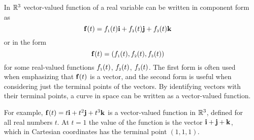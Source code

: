 In $\mathbb{R}^3$ vector-valued function of a real variable can be written in component form as
\begin{displaymath}
 \mathbf{ f}(t) = f_{\scriptscriptstyle 1}(t) \mathbf{ i} + f_{\scriptscriptstyle 2}(t) \mathbf{ j} + f_{\scriptscriptstyle 3}(t) \mathbf{ k}
\end{displaymath}
or in the form
\begin{displaymath}
 \mathbf{ f}(t) = ( f_{\scriptscriptstyle 1}(t),f_{\scriptscriptstyle 2}(t),f_{\scriptscriptstyle 3}(t) )
\end{displaymath}
for some real-valued functions $f_{\scriptscriptstyle 1}(t)$, $f_{\scriptscriptstyle 2}(t)$, $f_{\scriptscriptstyle 3}(t)$.  The first form is often used when emphasizing that $\mathbf{ f}(t)$ is a vector, and the
second form is useful when considering just the terminal points of the vectors.
By identifying vectors with their terminal points, a curve in space can be written as a vector-valued function.



\begin{exa}
For example, $\mathbf{ f}(t) = t \mathbf{ i} + t^2 \mathbf{ j} + t^3 \mathbf{ k}$ is a vector-valued function in $\mathbb{R}^3$,
defined for all real numbers $t$.  At $t = 1$
the value of the function is the vector $\mathbf{ i} + \mathbf{ j} + \mathbf{ k}$, which in Cartesian coordinates has the
terminal point $(1,1,1)$.
\end{exa}


\begin{figure}[h]
\centering
{}

\end{figure}



